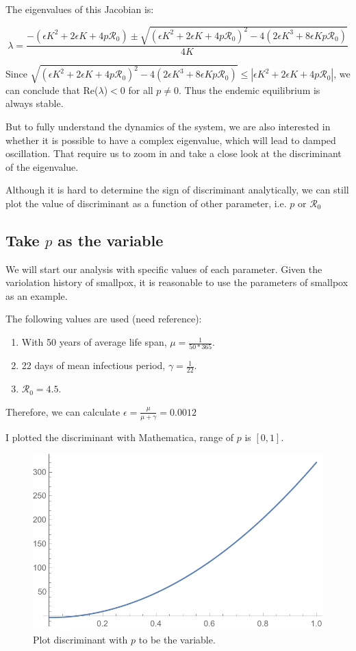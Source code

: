 \documentclass[12pt]{article}
\newcommand{\R}{\mathcal{R}}
\begin{document}
The eigenvalues of this Jacobian is:

\begin{equation}
\lambda = \frac{-(\epsilon K^2+2\epsilon K +4p\mathcal{R}_0) \pm \sqrt{(\epsilon K^2+2\epsilon K +4p\mathcal{R}_0)^2-4(2\epsilon K^3+8\epsilon Kp\mathcal{R}_0)}}{4K}
\end{equation}

Since $\sqrt{(\epsilon K^2+2\epsilon K +4p\mathcal{R}_0)^2-4(2\epsilon K^3+8\epsilon Kp\mathcal{R}_0)}\leq |\epsilon K^2+2\epsilon K +4p\mathcal{R}_0|$, we can conclude that Re($\lambda$)$<0$ for all $p\neq 0$. Thus the endemic equilibrium is always stable.

But to fully understand the dynamics of the system, we are also interested in whether it is possible to have a complex eigenvalue, which will lead to damped oscillation. That require us to zoom in and take a close look at the discriminant of the eigenvalue.

Although it is hard to determine the sign of discriminant analytically, we can still plot the value of discriminant as a function of other parameter, i.e. $p$ or $\R_0$

\subsection{Take $p$ as the variable}

We will start our analysis with specific values of each parameter. Given the variolation history of smallpox, it is reasonable to use the parameters of smallpox as an example.

The following values are used (need reference): 
\begin{enumerate}
\item With 50 years of average life span, $\mu=\frac{1}{50*365}$.
\item 22 days of mean infectious period, $\gamma=\frac{1}{22}$.
\item $\R_0=4.5$.
\end{enumerate}
Therefore, we can calculate $\epsilon=\frac{\mu}{\mu+\gamma}=0.0012$

I plotted the discriminant with Mathematica, range of $p$ is $[0,1]$.

\begin{figure}[H]
  \caption{Plot discriminant with $p$ to be the variable.}
  \centering
  \includegraphics[width=1.1\textwidth]{Figures/Discriminant_plot_newborn.pdf}
\end{figure}
\end{document}

